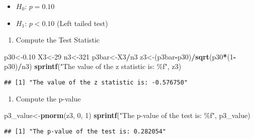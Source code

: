\documentclass[
]{article}
\newenvironment{Shaded}{\begin{snugshade}}{\end{snugshade}}
\newcommand{\DecValTok}[1]{\textcolor[rgb]{0.00,0.00,0.81}{#1}}
\newcommand{\FloatTok}[1]{\textcolor[rgb]{0.00,0.00,0.81}{#1}}
\newcommand{\FunctionTok}[1]{\textcolor[rgb]{0.13,0.29,0.53}{\textbf{#1}}}
\newcommand{\NormalTok}[1]{#1}
\newcommand{\OtherTok}[1]{\textcolor[rgb]{0.56,0.35,0.01}{#1}}
\newcommand{\SpecialCharTok}[1]{\textcolor[rgb]{0.81,0.36,0.00}{\textbf{#1}}}
\newcommand{\StringTok}[1]{\textcolor[rgb]{0.31,0.60,0.02}{#1}}
\providecommand{\tightlist}{%
  \setlength{\itemsep}{0pt}\setlength{\parskip}{0pt}}
\begin{document}
\begin{itemize}
\tightlist
\item
  \(H_{0}\): \(p=0.10\)
\item
  \(H_{1}\): \(p<0.10\) (Left tailed test)
\end{itemize}

\begin{enumerate}
\def\labelenumi{\arabic{enumi}.}
\setcounter{enumi}{1}
\tightlist
\item
  Compute the Test Statistic
\end{enumerate}

\begin{Shaded}
\begin{Highlighting}[]
\NormalTok{p30}\OtherTok{\textless{}{-}}\FloatTok{0.10}
\NormalTok{X3}\OtherTok{\textless{}{-}}\DecValTok{29}
\NormalTok{n3}\OtherTok{\textless{}{-}}\DecValTok{321}
\NormalTok{p3bar}\OtherTok{\textless{}{-}}\NormalTok{X3}\SpecialCharTok{/}\NormalTok{n3}
\NormalTok{z3}\OtherTok{\textless{}{-}}\NormalTok{(p3bar}\SpecialCharTok{{-}}\NormalTok{p30)}\SpecialCharTok{/}\FunctionTok{sqrt}\NormalTok{(p30}\SpecialCharTok{*}\NormalTok{(}\DecValTok{1}\SpecialCharTok{{-}}\NormalTok{p30)}\SpecialCharTok{/}\NormalTok{n3)}
\FunctionTok{sprintf}\NormalTok{(}\StringTok{"The value of the z statistic is: \%f"}\NormalTok{, z3)}
\end{Highlighting}
\end{Shaded}

\begin{verbatim}
## [1] "The value of the z statistic is: -0.576750"
\end{verbatim}

\begin{enumerate}
\def\labelenumi{\arabic{enumi}.}
\setcounter{enumi}{2}
\tightlist
\item
  Compute the p-value
\end{enumerate}

\begin{Shaded}
\begin{Highlighting}[]
\NormalTok{p3\_value}\OtherTok{\textless{}{-}}\FunctionTok{pnorm}\NormalTok{(z3, }\DecValTok{0}\NormalTok{, }\DecValTok{1}\NormalTok{)}
\FunctionTok{sprintf}\NormalTok{(}\StringTok{"The p{-}value of the test is: \%f"}\NormalTok{, p3\_value)}
\end{Highlighting}
\end{Shaded}

\begin{verbatim}
## [1] "The p-value of the test is: 0.282054"
\end{verbatim}
\end{document}
